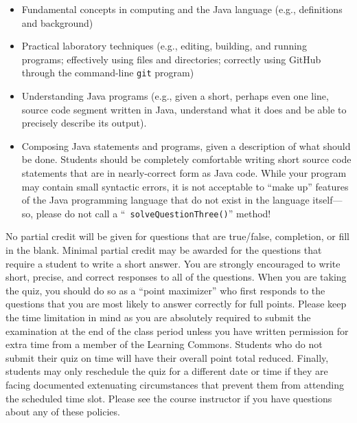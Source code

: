 \documentclass[11pt]{article}
\begin{document}
\vspace*{-.05in}
\begin{itemize}

  \itemsep 0in

  \item Fundamental concepts in computing and the Java language (e.g.,
    definitions and background)

  \item Practical laboratory techniques (e.g., editing, building, and running
    programs; effectively using files and directories; correctly using GitHub
    through the command-line {\tt git} program)

  \item Understanding Java programs (e.g., given a short, perhaps even one line,
    source code segment written in Java, understand what it does and be able to
    precisely describe its output).

  \item Composing Java statements and programs, given a description of what
    should be done. Students should be completely comfortable writing short
    source code statements that are in nearly-correct form as Java code. While
    your program may contain small syntactic errors, it is not acceptable to
    ``make up'' features of the Java programming language that do not exist in
    the language itself---so, please do not call a ``{\tt
    solveQuestionThree()}'' method!

\end{itemize}

\noindent No partial credit will be given for questions that are true/false,
completion, or fill in the blank. Minimal partial credit may be awarded for the
questions that require a student to write a short answer. You are strongly
encouraged to write short, precise, and correct responses to all of the
questions. When you are taking the quiz, you should do so as a ``point
maximizer'' who first responds to the questions that you are most likely to
answer correctly for full points. Please keep the time limitation in mind as you
are absolutely required to submit the examination at the end of the class period
unless you have written permission for extra time from a member of the Learning
Commons. Students who do not submit their quiz on time will have their overall
point total reduced. Finally, students may only reschedule the quiz for a
different date or time if they are facing documented extenuating circumstances
that prevent them from attending the scheduled time slot. Please see the course
instructor if you have questions about any of these policies.
\end{document}
